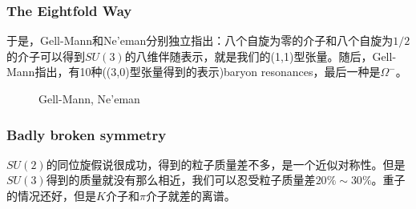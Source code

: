 \documentclass[CJK]{beamer}
\begin{document}
\begin{frame}\frametitle{\bch The Eightfold Way\ech}
  \bch
  于是，Gell-Mann和Ne'eman分别独立指出：八个自旋为零的介子和八个自旋为$1/2$的介子可以得到$SU(3)$的八维伴随表示，就是我们的(1,1)型张量。随后，Gell-Mann指出，有10种((3,0)型张量得到的表示)baryon resonances，最后一种是$\Omega^-$。
   \begin{figure}
\centering  
{}
\caption{Gell-Mann, Ne'eman}
\end{figure}
  \ech
\end{frame}
\begin{frame}\frametitle{Badly broken symmetry}
  \bch
  $SU(2)$的同位旋假说很成功，得到的粒子质量差不多，是一个近似对称性。但是$SU(3)$得到的质量就没有那么相近，我们可以忍受粒子质量差$20\% \sim 30\%$。重子的情况还好，但是$K$介子和$\pi$介子就差的离谱。
  \ech
\end{frame}
\end{document}
